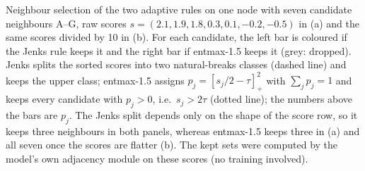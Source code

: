 Neighbour selection of the two adaptive rules on one node with seven candidate neighbours A--G, raw scores $s = (2.1, 1.9, 1.8, 0.3, 0.1, -0.2, -0.5)$ in (a) and the same scores divided by 10 in (b). For each candidate, the left bar is coloured if the Jenks rule keeps it and the right bar if entmax-1.5 keeps it (grey: dropped). Jenks splits the sorted scores into two natural-breaks classes (dashed line) and keeps the upper class; entmax-1.5 assigns $p_j = [s_j/2 - \tau]_+^2$ with $\sum_j p_j = 1$ and keeps every candidate with $p_j > 0$, i.e.\ $s_j > 2\tau$ (dotted line); the numbers above the bars are $p_j$. The Jenks split depends only on the shape of the score row, so it keeps three neighbours in both panels, whereas entmax-1.5 keeps three in (a) and all seven once the scores are flatter (b). The kept sets were computed by the model's own adjacency module on these scores (no training involved).
